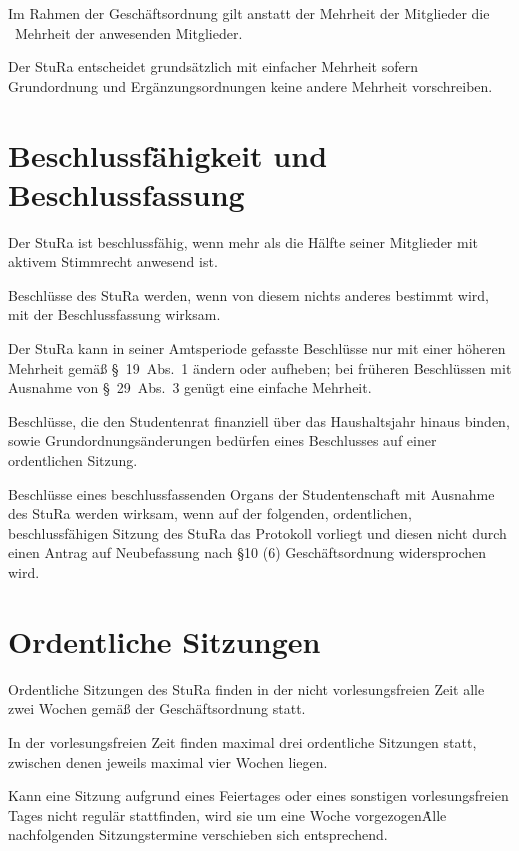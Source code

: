 \begin{multicols}{2}
\Abs \Satz Im Rahmen der Geschäftsordnung gilt anstatt der Mehrheit der Mitglieder die ~Mehrheit der anwesenden Mitglieder.

\Abs \Satz Der StuRa entscheidet grundsätzlich mit einfacher Mehrheit sofern Grundordnung und Ergänzungsordnungen keine andere Mehrheit vorschreiben.



\section{Beschlussfähigkeit und Beschlussfassung}

\Abs \Satz Der StuRa ist beschlussfähig, wenn mehr als die Hälfte seiner Mitglieder mit aktivem Stimmrecht anwesend ist.

\Abs \Satz Beschlüsse des StuRa werden, wenn von diesem nichts anderes bestimmt wird, mit der Beschlussfassung wirksam.

\Abs \Satz Der StuRa kann in seiner Amtsperiode gefasste Beschlüsse nur mit einer höheren Mehrheit gemäß §~19~Abs.~1 ändern oder aufheben; bei früheren Beschlüssen mit Ausnahme von \S~29~Abs.~3 genügt eine einfache Mehrheit.

\Abs \Satz Beschlüsse, die den Studentenrat finanziell über das Haushaltsjahr hinaus binden, sowie Grundordnungsänderungen bedürfen eines Beschlusses auf einer ordentlichen Sitzung.

\Abs \Satz Beschlüsse eines beschlussfassenden Organs der Studentenschaft mit Ausnahme des StuRa werden wirksam, wenn auf der folgenden, ordentlichen, beschlussfähigen Sitzung des StuRa das Protokoll vorliegt und diesen nicht durch einen Antrag auf Neubefassung nach §10 (6) Geschäftsordnung widersprochen wird.



\section{Ordentliche Sitzungen}

\Abs \Satz Ordentliche Sitzungen des StuRa finden in der nicht vorlesungsfreien Zeit alle zwei Wochen gemäß der Geschäftsordnung statt.

\Abs \Satz In der vorlesungsfreien Zeit finden maximal drei ordentliche Sitzungen statt, zwischen denen jeweils maximal vier Wochen liegen.

\Abs \Satz Kann eine Sitzung aufgrund eines Feiertages oder eines sonstigen vorlesungsfreien Tages nicht regulär stattfinden, wird sie um eine Woche vorgezogen\. Alle nachfolgenden Sitzungstermine verschieben sich entsprechend.


\end{multicols}
